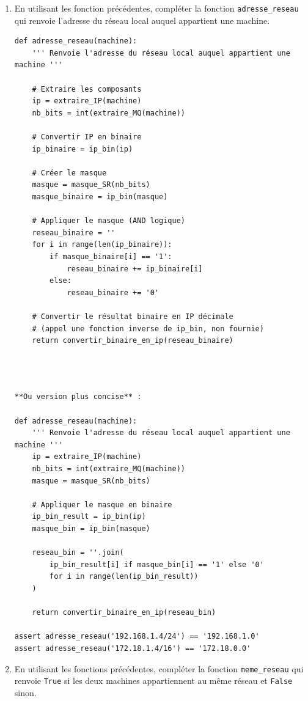 \documentclass[11pt, a4paper]{report}
\begin{document}
   \begin{enumerate}[resume]
    \item En utilisant les fonction précédentes, compléter la fonction \verb|adresse_reseau| qui renvoie l'adresse du réseau local auquel appartient une machine.

\begin{verbatim}
def adresse_reseau(machine):
    ''' Renvoie l'adresse du réseau local auquel appartient une machine '''
    
    # Extraire les composants
    ip = extraire_IP(machine)
    nb_bits = int(extraire_MQ(machine))
    
    # Convertir IP en binaire
    ip_binaire = ip_bin(ip)
    
    # Créer le masque
    masque = masque_SR(nb_bits)
    masque_binaire = ip_bin(masque)
    
    # Appliquer le masque (AND logique)
    reseau_binaire = ''
    for i in range(len(ip_binaire)):
        if masque_binaire[i] == '1':
            reseau_binaire += ip_binaire[i]
        else:
            reseau_binaire += '0'
    
    # Convertir le résultat binaire en IP décimale
    # (appel une fonction inverse de ip_bin, non fournie)
    return convertir_binaire_en_ip(reseau_binaire)
    
\end{verbatim}

 
   \begin{verbatim}


**Ou version plus concise** :

def adresse_reseau(machine):
    ''' Renvoie l'adresse du réseau local auquel appartient une machine '''
    ip = extraire_IP(machine)
    nb_bits = int(extraire_MQ(machine))
    masque = masque_SR(nb_bits)
    
    # Appliquer le masque en binaire
    ip_bin_result = ip_bin(ip)
    masque_bin = ip_bin(masque)
    
    reseau_bin = ''.join(
        ip_bin_result[i] if masque_bin[i] == '1' else '0' 
        for i in range(len(ip_bin_result))
    )
    
    return convertir_binaire_en_ip(reseau_bin)

assert adresse_reseau('192.168.1.4/24') == '192.168.1.0'
assert adresse_reseau('172.18.1.4/16') == '172.18.0.0'
   \end{verbatim}


   \item En utilisant les fonctions précédentes, compléter la fonction \verb|meme_reseau| qui renvoie \verb|True| si les deux machines appartiennent au même réseau et \verb|False| sinon.
   

\end{enumerate}
\end{document}
